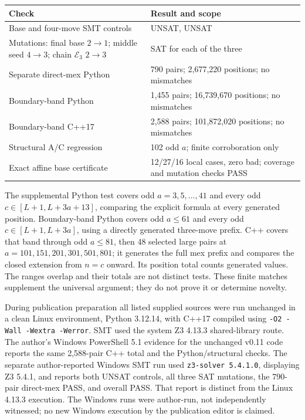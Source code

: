 \documentclass[10pt,a4paper]{article}
\newcommand{\E}{\mathcal E}
\begin{document}
\begin{center}\small
\begin{tabular}{p{.50\linewidth}p{.41\linewidth}}
\toprule
Check&Result and scope\\\midrule
Base and four-move SMT controls&UNSAT, UNSAT\\
Mutations: final base $2\to1$; middle seed $4\to3$; chain $\E_3$ $2\to3$&SAT for each of the three\\
Separate direct-mex Python&790 pairs; 2,677,220 positions; no mismatches\\
Boundary-band Python&1,455 pairs; 16,739,670 positions; no mismatches\\
Boundary-band C++17&2,588 pairs; 101,872,020 positions; no mismatches\\
Structural A/C regression&102 odd $a$; finite corroboration only\\
Exact affine base certificate&12/27/16 local cases, zero bad; coverage and mutation checks PASS\\\bottomrule
\end{tabular}
\end{center}
The supplemental Python test covers odd $a=3,5,\ldots,41$ and every odd $c\in[L+1,L+3a+13]$, comparing the explicit formula at every generated position. Boundary-band Python covers odd $a\le61$ and every odd $c\in[L+1,L+3a]$, using a directly generated three-move prefix. C++ covers that band through odd $a\le81$, then 48 selected large pairs at $a=101,151,201,301,501,801$; it generates the full mex prefix and compares the closed extension from $n=c$ onward. Its position total counts generated values. The ranges overlap and their totals are not distinct tests. These finite matches supplement the universal argument; they do not prove it or determine novelty.

During publication preparation all listed supplied sources were run unchanged in a clean Linux environment, Python 3.12.14, with C++17 compiled using \texttt{-O2 -Wall -Wextra -Werror}. SMT used the system Z3 4.13.3 shared-library route. The author's Windows PowerShell 5.1 evidence for the unchanged v0.11 code reports the same 2,588-pair C++ total and the Python/structural checks. The separate author-reported Windows SMT run used \texttt{z3-solver 5.4.1.0}, displaying Z3 5.4.1, and reports both UNSAT controls, all three SAT mutations, the 790-pair direct-mex PASS, and overall PASS. That report is distinct from the Linux 4.13.3 execution. The Windows runs were author-run, not independently witnessed; no new Windows execution by the publication editor is claimed.
\end{document}
